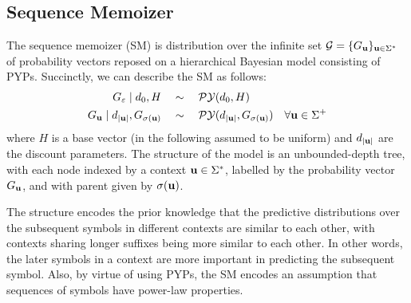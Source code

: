 \subsection{Sequence Memoizer}
The sequence memoizer (SM) \citep{wood2009sms} is distribution over the infinite set $\GG=\{G_\ubf\}_{\ubf\in\Sigma^*}$ of probability vectors reposed on a hierarchical Bayesian model consisting of PYPs.
%
Succinctly, we can describe the SM as follows:
\begin{subequations}
        \label{eqn:sm_prior}
        \begin{align}
            G_{\varepsilon} \mid d_0,H\quad &\sim \quad\py(d_0,H) \label{eq:m1} &\\
            G_{\ubf} \mid d_{|\ubf|},G_{\suffix(\ubf)} \quad
            &\sim \quad \py(d_{|\ubf|},G_{\suffix(\ubf)})  & \forall \ubf \in
            \Sigma^+ \label{eq:m2}%
        \end{align}
\end{subequations}
\noindent where $H$ is a base vector (in the following assumed to be
uniform) and $d_{|\ubf|}$ are the discount parameters.
The structure of the model is an unbounded-depth tree, with each node indexed by a context $\ubf\in\Sigma^*$, labelled by the probability vector $G_\ubf$, and with parent given by $\sigma(\ubf)$.  

The structure encodes the prior knowledge that the predictive distributions over the subsequent symbols in different contexts are similar to each other, with contexts sharing longer suffixes being more similar to each other.  In other words, the later symbols in a context are more important in predicting the subsequent symbol.  Also, by virtue of using PYPs, the SM encodes an assumption that sequences of symbols have power-law properties.

